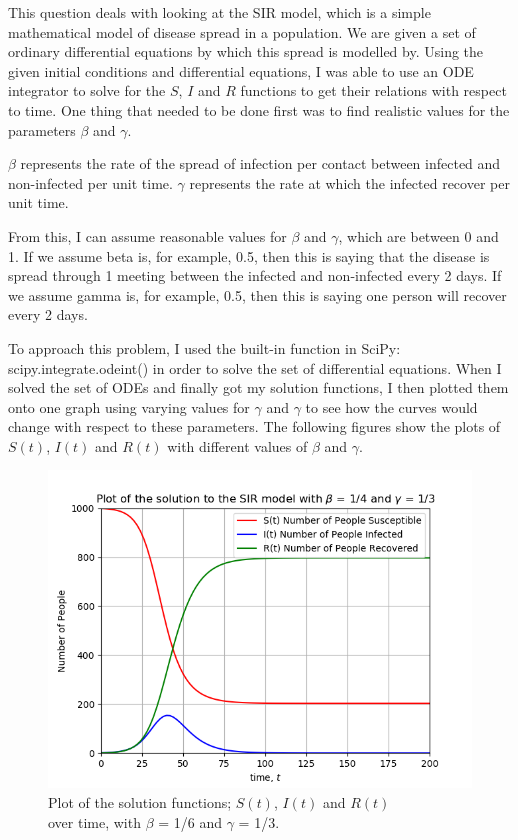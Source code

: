 \documentclass{article}
\begin{document}
This question deals with looking at the SIR model, which is a simple mathematical model of disease spread in a population. 
We are given a set of ordinary differential equations by which this spread is modelled by. 
Using the given initial conditions and differential equations, I was able to use an ODE integrator to solve for the $S$, $I$ and $R$ functions to get their relations with respect to time.
One thing that needed to be done first was to find realistic values for the parameters $\beta$ and $\gamma$. 

$\beta$ represents the rate of the spread of infection per contact between infected and non-infected per unit time.
$\gamma$ represents the rate at which the infected recover per unit time.

From this, I can assume reasonable values for $\beta$ and $\gamma$, which are between 0 and 1. 
If we assume beta is, for example, 0.5, then this is saying that the disease is spread through 1 meeting between the infected and non-infected every 2 days. 
If we assume gamma is, for example, 0.5, then this is saying one person will recover every 2 days.

To approach this problem, I used the built-in function in SciPy: scipy.integrate.odeint() in order to solve the set of differential equations.
When I solved the set of ODEs and finally got my solution functions, I then plotted them onto one graph using varying values for $\gamma$ and $\gamma$ to see how the curves would change with respect to these parameters.
The following figures show the plots of $S(t)$, $I(t)$ and $R(t)$ with different values of $\beta$ and $\gamma$.

\begin{figure}[!htb]
  \centering
  \includegraphics[width=1\linewidth]{Q2_plot1.png}
  \caption{Plot of the solution functions; $S(t)$, $I(t)$ and $R(t)$ \\ over time, with $\beta$ = 1/6 and $\gamma$ = 1/3.}
  \label{fig:Q2_plot1.png}
\end{figure}
\end{document}
